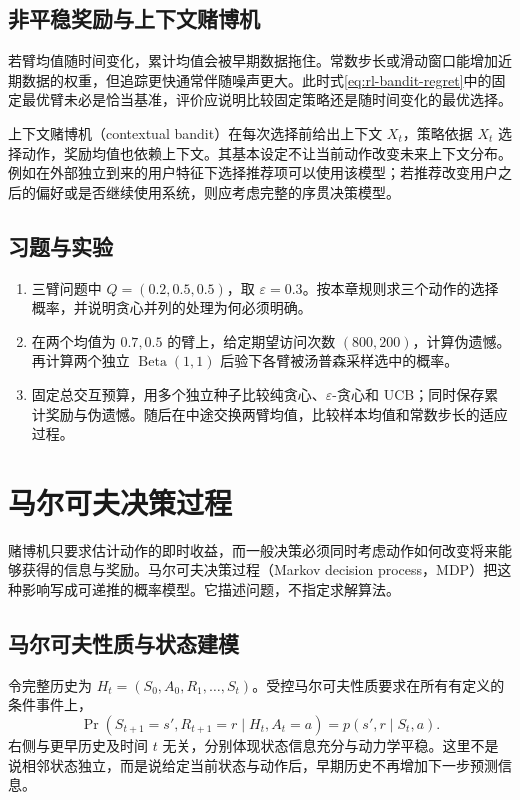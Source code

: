 \documentclass[UTF8,12pt,a4paper,fontset=fandol]{ctexbook}
\begin{document}
\section{非平稳奖励与上下文赌博机}

若臂均值随时间变化，累计均值会被早期数据拖住。常数步长或滑动窗口能增加近期数据的权重，但追踪更快通常伴随噪声更大。此时式\eqref{eq:rl-bandit-regret}中的固定最优臂未必是恰当基准，评价应说明比较固定策略还是随时间变化的最优选择。

上下文赌博机（contextual bandit）在每次选择前给出上下文 $X_t$，策略依据 $X_t$ 选择动作，奖励均值也依赖上下文。其基本设定不让当前动作改变未来上下文分布。例如在外部独立到来的用户特征下选择推荐项可以使用该模型；若推荐改变用户之后的偏好或是否继续使用系统，则应考虑完整的序贯决策模型。

\section{习题与实验}
\begin{enumerate}
\item 三臂问题中 $Q=(0.2,0.5,0.5)$，取 $\varepsilon=0.3$。按本章规则求三个动作的选择概率，并说明贪心并列的处理为何必须明确。
\item 在两个均值为 $0.7,0.5$ 的臂上，给定期望访问次数 $(800,200)$，计算伪遗憾。再计算两个独立 $\operatorname{Beta}(1,1)$ 后验下各臂被汤普森采样选中的概率。
\item 固定总交互预算，用多个独立种子比较纯贪心、$\varepsilon$-贪心和 UCB；同时保存累计奖励与伪遗憾。随后在中途交换两臂均值，比较样本均值和常数步长的适应过程。
\end{enumerate}

\chapter{马尔可夫决策过程}
\label{ch:rl-mdp}

赌博机只要求估计动作的即时收益，而一般决策必须同时考虑动作如何改变将来能够获得的信息与奖励。马尔可夫决策过程（Markov decision process，MDP）把这种影响写成可递推的概率模型。它描述问题，不指定求解算法。

\section{马尔可夫性质与状态建模}

令完整历史为 $H_t=(S_0,A_0,R_1,\ldots,S_t)$。受控马尔可夫性质要求在所有有定义的条件事件上，
\[
\Pr(S_{t+1}=s',R_{t+1}=r\mid H_t,A_t=a)
=p(s',r\mid S_t,a).
\]
右侧与更早历史及时间 $t$ 无关，分别体现状态信息充分与动力学平稳。这里不是说相邻状态独立，而是说给定当前状态与动作后，早期历史不再增加下一步预测信息。
\end{document}
